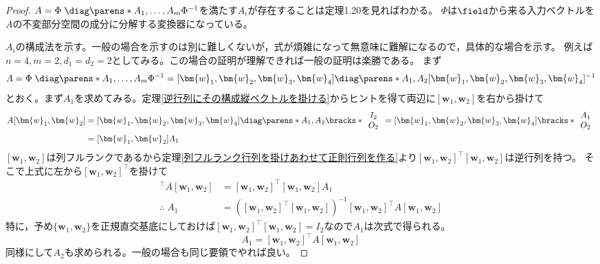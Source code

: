         \begin{proof}
            $A = \Phi\;\diag\parens*{A_1,\dotsc,A_m}\Phi^{-1}$を満たす$A_i$が存在することは\cite{システム線形代数}定理1.20を見ればわかる。
            $\Phi$は$\field$から来る入力ベクトルを$A$の不変部分空間の成分に分解する変換器になっている。
            \par
            $A_i$の構成法を示す。一般の場合を示すのは別に難しくないが，式が煩雑になって無意味に難解になるので，具体的な場合を示す。
            例えば$n=4, m=2, d_1=d_2=2$としてみる。この場合の証明が理解できれば一般の証明は楽勝である。
            まず
            \[A = \Phi\;\diag\parens*{A_1,\dotsc,A_m}\Phi^{-1} = [\bm{w}_1,\bm{w}_2,\bm{w}_3,\bm{w}_4]\diag\parens*{A_1,A_2}[\bm{w}_1,\bm{w}_2,\bm{w}_3,\bm{w}_4]^{-1}\]
            とおく。まず$A_1$を求めてみる。定理\ref{逆行列にその構成縦ベクトルを掛ける}からヒントを得て両辺に$[\bm{w}_1,\bm{w}_2]$を右から掛けて
            \begin{align*}
                A[\bm{w}_1,\bm{w}_2] &= [\bm{w}_1,\bm{w}_2,\bm{w}_3,\bm{w}_4]\diag\parens*{A_1,A_2}
                \bracks*{
                    \begin{array}{c}
                        I_2\\
                        O_2
                    \end{array}
                } = [\bm{w}_1,\bm{w}_2,\bm{w}_3,\bm{w}_4]
                \bracks*{
                    \begin{array}{c}
                        A_1\\
                        O_2
                    \end{array}
                }\\
                &= [\bm{w}_1,\bm{w}_2]A_1
            \end{align*}
            $[\bm{w}_1,\bm{w}_2]$は列フルランクであるから定理\ref{列フルランク行列を掛けあわせて正則行列を作る}より$[\bm{w}_1,\bm{w}_2]^\top[\bm{w}_1,\bm{w}_2]$は逆行列を持つ。
            そこで上式に左から$[\bm{w}_1,\bm{w}_2]^\top$を掛けて
            \begin{align*}
                [\bm{w}_1,\bm{w}_2]^\top A[\bm{w}_1,\bm{w}_2] &= [\bm{w}_1,\bm{w}_2]^\top[\bm{w}_1,\bm{w}_2]A_1\\
                \therefore\;A_1 &= ([\bm{w}_1,\bm{w}_2]^\top[\bm{w}_1,\bm{w}_2])^{-1}[\bm{w}_1,\bm{w}_2]^\top A[\bm{w}_1,\bm{w}_2]
            \end{align*}
            特に，予め$\{\bm{w}_1,\bm{w}_2\}$を正規直交基底にしておけば$[\bm{w}_1,\bm{w}_2]^\top[\bm{w}_1,\bm{w}_2] = I_2$なので$A_1$は次式で得られる。
            \[A_1 = [\bm{w}_1,\bm{w}_2]^\top A[\bm{w}_1,\bm{w}_2]\]
            同様にして$A_2$も求められる。一般の場合も同じ要領でやれば良い。
        \end{proof}
